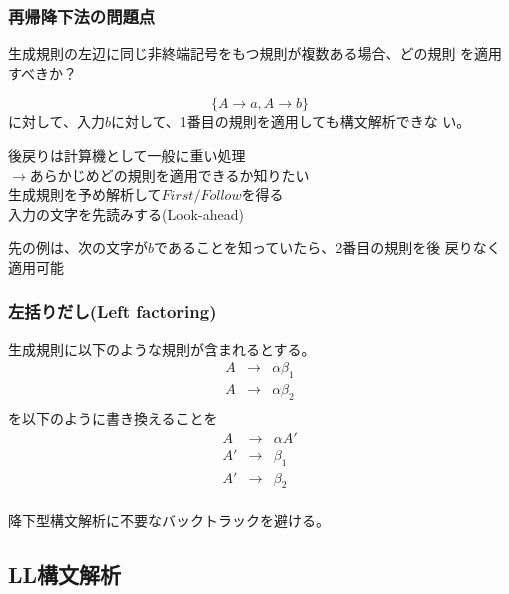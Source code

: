 \documentclass[dvipdfmx]{beamer}
\begin{document}
\begin{frame}
  \frametitle{再帰降下法の問題点}
  \begin{list}{}{}
    \item 生成規則の左辺に同じ非終端記号をもつ規則が複数ある場合、どの規則
          を適用すべきか？\\

          \[
            \{A\rightarrow a,A\rightarrow b\}
          \]
          に対して、入力$b$に対して、1番目の規則を適用しても構文解析できな
          い。

          後戻りは計算機として一般に重い処理\\
          \quad$\rightarrow$あらかじめどの規則を適用できるか知りたい\\
          \qquad 生成規則を予め解析して$First/Follow$を得る\\
          \quad 入力の文字を先読みする(Look-ahead)

          先の例は、次の文字が$b$であることを知っていたら、2番目の規則を後
          戻りなく適用可能
  \end{list}
\end{frame}

\begin{frame}
  \frametitle{左括りだし(Left factoring)}

  生成規則に以下のような規則が含まれるとする。
  \[
    \begin{array}{rcl}
      A & \rightarrow & \alpha\beta_1 \\
      A & \rightarrow & \alpha\beta_2 \\
    \end{array}
  \]
  を以下のように書き換えることを
  \[
    \begin{array}{rcl}
      A  & \rightarrow & \alpha A' \\
      A' & \rightarrow & \beta_1   \\
      A' & \rightarrow & \beta_2   \\
    \end{array}
  \]

  降下型構文解析に不要なバックトラックを避ける。

\end{frame}

\subsection{LL構文解析}
\end{document}
